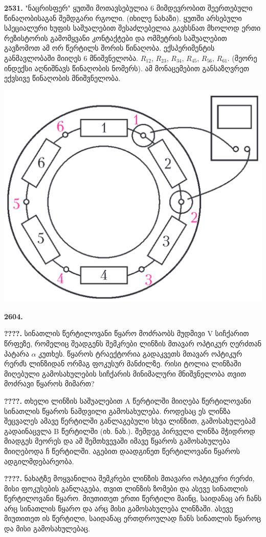\documentclass[12pt,a4paper,]{report}
\begin{document}
\textbf{2531.} "ნაცრისფერ" ყუთში მოთავსებულია 6 მიმდევრობით შეერთებული წინაღობისაგან შემდგარი რგოლი. (იხილე ნახაზი). ყუთში არსებული სპეციალური ხუფის საშუალებით შესაძლებელია გავხსნათ მხოლოდ ერთი რეზისტორის გამომყვანი კონტაქტები და ომმეტრის საშუალებით გავზომოთ ამ ორ წერტილს შორის წინაღობა. ექსპერიმენტის განმავლობაში მიიღეს 6 მნიშვნელობა. $R_{12}$, $R_{23}$, $R_{34}$, $R_{45}$, $R_{56}$, $R_{61}$. (მეორე ინდექსი აღნიშნავს წინაღობის ნომერს). ამ მონაცემებით განსაზღვრეთ ექვსივე წინაღობის მნიშვნელობა.
	\begin{center}
		\includegraphics[scale=0.3]{images/F2531.png}
	\end{center}

\textbf{2604.} 
	
\textbf{????.} სინათლის წერტილოვანი წყარო მოძრაობს მუდმივი V სიჩქარით წრფეზე, რომელიც შეადგენს შემკრები ლინზის მთავარ ოპტიკურ ღერძთან  პატარა $\alpha$ კუთხეს. წყაროს ტრაექტორია გადაკვეთს მთავარ ოპტიკურ რერძს ლინზიდან ორმაგ ფოკუსურ მანძილზე. რისი ტოლია ლინზაში მიღებული გამოსახულების სიჩქარის მინიმალური მნიშვნელობა თვით მოძრავი წყაროს მიმართ?

\textbf{????.} თხელი ლინზის საშუალებით A წერტილში მიიღება წერტილოვანი სინათლის წყაროს ნამდვილი გამოსახულება. როდესაც ეს ლინზა შეცვალეს ამავე წერტილში განლაგებული სხვა ლინზით, გამოსახულებამ გადაინაცვლა B წერტილში (იხ. ნახ.). შემდეგ პირველი ლინზა მჭიდროდ მიადგეს მეორეს და ამ შემთხვევაში იმავე წყაროს გამოსახულება მიიღებოდა ჩ წერტილში. აგებით დაადგინეთ წერტილოვანი წყაროს ადგილმდებარეობა.

\textbf{????.} ნახატზე მოყვანილია შემკრები ლინზის მთავარი ოპტიკური რერძი, მისი ფოკუსების განლაგება, თვით ლინზის ზომები და ასევე სინათლის წერტილოვანი წყარო. მიუთითეთ ერთი წერტილი მაინც, საიდანაც არ ჩანს არც სინათლის წყარო და არც მისი გამოსახულება ლინზაში. ასევე მიუთითეთ ის წერტილი, საიდანაც ერთდროულად ჩანს სინათლის წყაროც და მისი გამოსახულებაც.
\end{document}
